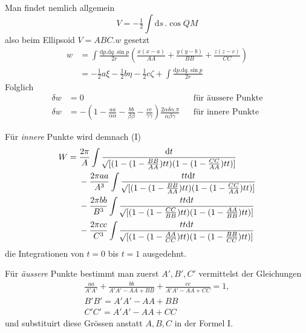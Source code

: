 \clearpage
{}

Man findet nemlich allgemein
\[
V=-\tfrac12\int \mathrm{d}s\,.\cos QM
\]
also beim Ellipsoid $V=ABC.w$ gesetzt
\[
\begin{aligned}
w&=\int\frac{\mathrm{d}p.\mathrm{d}q.\sin p}{2r}
 \left(\frac{x(x-a)}{AA}+\frac{y(y-b)}{BB}+\frac{z(z-c)}{CC}\right)\\
 &=-\tfrac12a\xi-\tfrac12b\eta-\tfrac12c\zeta
   +\int\frac{\mathrm{d}p.\mathrm{d}q.\sin p}{2r}
\end{aligned}
\]
Folglich
\[
\begin{aligned}
\delta w&=0 &&\text{für äussere Punkte}\\
\delta w&=-\left(1-\frac{aa}{\alpha\alpha}
 -\frac{bb}{\beta\beta}-\frac{cc}{\gamma\gamma}\right)
 \frac{2\alpha\delta\alpha.\pi}{\alpha\beta\gamma}
 &&\text{für innere Punkte}
\end{aligned}
\]

Für \textit{innere} Punkte wird demnach (I)
\[
\begin{aligned}
W={}&\frac{2\pi}{A}\int
 \frac{\mathrm{d}t}{\mathord{{}^{}\!\surd}[(1-(1-\frac{BB}{AA})tt)(1-(1-\frac{CC}{AA})tt)]}\\
&-\frac{2\pi aa}{A^3}\int
 \frac{tt\mathrm{d}t}{\mathord{{}^{}\!\surd}[(1-(1-\frac{BB}{AA})tt)(1-(1-\frac{CC}{AA})tt)]}\\
&-\frac{2\pi bb}{B^3}\int
 \frac{tt\mathrm{d}t}{\mathord{{}^{}\!\surd}[(1-(1-\frac{CC}{BB})tt)(1-(1-\frac{AA}{BB})tt)]}\\
&-\frac{2\pi cc}{C^3}\int
 \frac{tt\mathrm{d}t}{\mathord{{}^{}\!\surd}[(1-(1-\frac{AA}{CC})tt)(1-(1-\frac{BB}{CC})tt)]}
\end{aligned}
\]
die Integrationen von $t=0$ bis $t=1$ ausgedehnt.

Für \textit{äussere} Punkte bestimmt man zuerst $A',B',C'$ vermittelst der Gleichungen
\[
\begin{gathered}
\frac{aa}{A'A'}+\frac{bb}{A'A'-AA+BB}+\frac{cc}{A'A'-AA+CC}=1,\\
B'B'=A'A'-AA+BB\\
C'C'=A'A'-AA+CC
\end{gathered}
\]
und substituirt diese Grössen anstatt $A,B,C$ in der Formel I.
